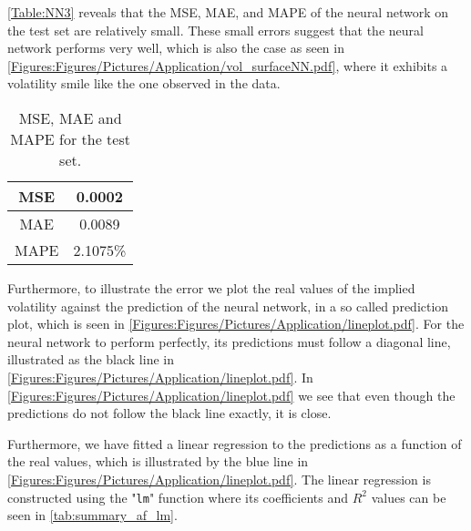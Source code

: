 
\autoref{Table:NN3} reveals that the MSE, MAE, and MAPE of the neural network on the test set are relatively small. These small errors suggest that the neural network performs very well, which is also the case as seen in \autoref{Figures:Figures/Pictures/Application/vol_surfaceNN.pdf}, where it exhibits a volatility smile like the one observed in the data.

\begin{table}[H]
    \centering
    {\renewcommand{\arraystretch}{1.25}\begin{tabular}{c|c}
        MSE  &  0.0002\\ \hline
        MAE  &  0.0089\\ \hline
        MAPE &  2.1075\%\\ 
    \end{tabular}}
    \caption{MSE, MAE and MAPE for the test set.}
    \label{Table:NN3}
\end{table}

Furthermore, to illustrate the error we plot the real values of the implied volatility against the prediction of the neural network, in a so called prediction plot, which is seen in \autoref{Figures:Figures/Pictures/Application/lineplot.pdf}. For the neural network to perform perfectly, its predictions must follow a diagonal line, illustrated as the black line in \autoref{Figures:Figures/Pictures/Application/lineplot.pdf}. In \autoref{Figures:Figures/Pictures/Application/lineplot.pdf} we see that even though the predictions do not follow the black line exactly, it is close.


Furthermore, we have fitted a linear regression to the predictions as a function of the real values, which is illustrated by the blue line in \autoref{Figures:Figures/Pictures/Application/lineplot.pdf}. The linear regression is constructed using the "\lstinline{lm}" function where its coefficients and $R^2$ values can be seen in \autoref{tab:summary_af_lm}.

